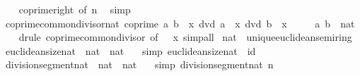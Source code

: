 \begin{isabellebody}
%
\isadelimproof
\ \ %
\endisadelimproof
%
\isatagproof
{}\isamarkupfalse%
\ coprime{\isacharunderscore}{\kern0pt}{}{\isacharunderscore}{\kern0pt}right\ {\isacharbrackleft}{\kern0pt}of\ n{\isacharbrackright}{\kern0pt}\ \isamarkupfalse%
\ simp%
\endisatagproof
{\isafoldproof}%
%
\isadelimproof
\isanewline
%
\endisadelimproof
\isanewline
{}\isamarkupfalse%
\ coprime{\isacharunderscore}{\kern0pt}common{\isacharunderscore}{\kern0pt}divisor{\isacharunderscore}{\kern0pt}nat{\isacharcolon}{\kern0pt}\ {\isachardoublequoteopen}coprime\ a\ b\ {\isasymLongrightarrow}\ x\ dvd\ a\ {\isasymLongrightarrow}\ x\ dvd\ b\ {\isasymLongrightarrow}\ x\ {\isacharequal}{\kern0pt}\ {}{\isachardoublequoteclose}\isanewline
\ \ \ a\ b\ {\isacharcolon}{\kern0pt}{\isacharcolon}{\kern0pt}\ nat\isanewline
%
\isadelimproof
\ \ %
\endisadelimproof
%
\isatagproof
{}\isamarkupfalse%
\ {\isacharparenleft}{\kern0pt}drule\ coprime{\isacharunderscore}{\kern0pt}common{\isacharunderscore}{\kern0pt}divisor\ {\isacharbrackleft}{\kern0pt}of\ {\isacharunderscore}{\kern0pt}\ {\isacharunderscore}{\kern0pt}\ x{\isacharbrackright}{\kern0pt}{\isacharparenright}{\kern0pt}\ simp{\isacharunderscore}{\kern0pt}all%
\endisatagproof
{\isafoldproof}%
%
\isadelimproof
\isanewline
%
\endisadelimproof
\isanewline
{}\isamarkupfalse%
\ nat\ {\isacharcolon}{\kern0pt}{\isacharcolon}{\kern0pt}\ unique{\isacharunderscore}{\kern0pt}euclidean{\isacharunderscore}{\kern0pt}semiring\isanewline
{}\isanewline
\isanewline
{}\isamarkupfalse%
\ euclidean{\isacharunderscore}{\kern0pt}size{\isacharunderscore}{\kern0pt}nat\ {\isacharcolon}{\kern0pt}{\isacharcolon}{\kern0pt}\ {\isachardoublequoteopen}nat\ {\isasymRightarrow}\ nat{\isachardoublequoteclose}\isanewline
\ \ \ {\isacharbrackleft}{\kern0pt}simp{\isacharbrackright}{\kern0pt}{\isacharcolon}{\kern0pt}\ {\isachardoublequoteopen}euclidean{\isacharunderscore}{\kern0pt}size{\isacharunderscore}{\kern0pt}nat\ {\isacharequal}{\kern0pt}\ id{\isachardoublequoteclose}\isanewline
\isanewline
{}\isamarkupfalse%
\ division{\isacharunderscore}{\kern0pt}segment{\isacharunderscore}{\kern0pt}nat\ {\isacharcolon}{\kern0pt}{\isacharcolon}{\kern0pt}\ {\isachardoublequoteopen}nat\ {\isasymRightarrow}\ nat{\isachardoublequoteclose}\isanewline
\ \ \ {\isacharbrackleft}{\kern0pt}simp{\isacharbrackright}{\kern0pt}{\isacharcolon}{\kern0pt}\ {\isachardoublequoteopen}division{\isacharunderscore}{\kern0pt}segment{\isacharunderscore}{\kern0pt}nat\ n\ {\isacharequal}{\kern0pt}\ {}{\isachardoublequoteclose}\isanewline

\end{isabellebody}

